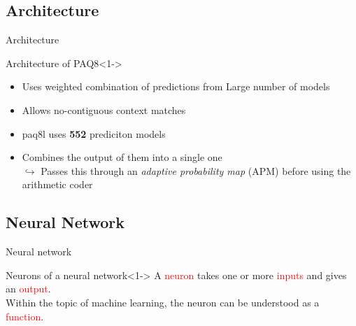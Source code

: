 \documentclass[11pt,usenames,dvipsnames]{beamer}
\newcommand{\defText}[1]{\textcolor{Red}{#1}}
\begin{document}
\subsection{Architecture}
\begin{frame}{Architecture}


	\begin{exampleblock}{Architecture of PAQ8}<1->
		\begin{itemize}
			\item Uses weighted combination of predictions from Large number of models
			\item Allows no-contiguous context matches
			\item paq8l uses \textbf{552} prediciton models
			\item Combines the output of them into a single one\\
			$\hookrightarrow$ Passes this through an \textit{adaptive probability map} (APM) before using the arithmetic coder
		\end{itemize}
	\end{exampleblock}
	\hfill
	

	

\end{frame}

\subsection{Neural Network}
\begin{frame}{Neural network}
		
	\begin{alertblock}{Neurons of a neural network}<1->
	A \defText{neuron} takes one or more \defText{inputs} and gives an \defText{output}. \\
	Within the topic of machine learning, the neuron can be understood as a \defText{function}.
	\end{alertblock}

	

		
	
\end{frame}
\end{document}
